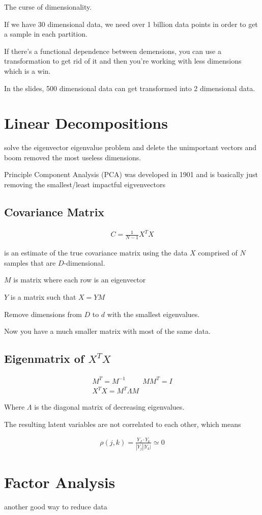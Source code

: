 \documentclass[fleqn]{report}
\newcommand{\hp}{\hspace{1cm}}
\newcommand{\equations} [1] {
\begin{gather*}
#1
\end{gather*}
}
\begin{document}
The curse of dimensionality. 

If we have 30 dimensional data, we need over 1 billion data points in order 
to get a sample in each partition. 

If there's a functional dependence between demensions, you can use a 
transformation to get rid of it and then you're working with less 
dimensions which is a win. 

In the slides, 500 dimensional data can get transformed into 2 dimensional data. 

\section{Linear Decompositions}
solve the eigenvector eigenvalue problem and delete the unimportant vectors and 
boom removed the most useless dimensions. 

Principle Component Analysis (PCA) was developed in 1901 and is 
basically just removing the smallest/least impactful eigvenvectors 

\subsection{Covariance Matrix}
\equations{
    C = \frac{1}{N - 1} X^T X
}
is an estimate of the true covariance matrix using the data $X$ 
comprised of $N$ samples that are $D$-dimensional. 

$M$ is matrix where each row is an eigenvector 

$Y$ is a matrix such that $X = Y M$

Remove dimensions from $D$ to $d$ with the smallest eigenvalues. 

Now you have a much smaller matrix with most of the same data. 

\subsection{Eigenmatrix of $X^T X$}
\equations{
    M^T = M^{-1}
    \hp 
    M M^T = I
    \\
    X^T X = M^T \Lambda M 
}
Where $\Lambda$ is the diagonal matrix of decreasing eigenvalues. 

The resulting latent variables are not correlated to each other, 
which means 
\equations{
    \rho(j, k) = \frac{Y_J \cdot Y_k}{|Y_j||Y_k|} \simeq 0
}

\section{Factor Analysis}
another good way to reduce data 
\end{document}
